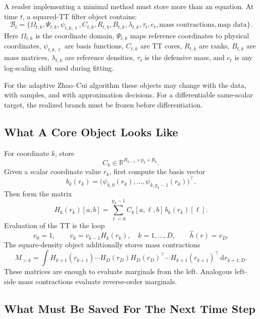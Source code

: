 \documentclass[11pt]{article}
\newcommand{\R}{\mathbb R}
\newcommand{\dd}{\,\mathrm d}
\begin{document}
A reader implementing a minimal method must store more than an equation.  At
time \(t\), a squared-TT filter object contains:
\[
    \mathcal B_t
    =
    \{
    \Omega_{t,k},\Psi_{t,k},\psi_{t,k,\ell},C_{t,k},
    R_{t,k},B_{t,k},\lambda_{t,k},\tau_t,c_t,
    \text{mass contractions},\text{map data}
    \}.
\]
Here \(\Omega_{t,k}\) is the coordinate domain, \(\Psi_{t,k}\) maps reference
coordinates to physical coordinates, \(\psi_{t,k,\ell}\) are basis functions,
\(C_{t,k}\) are TT cores, \(R_{t,k}\) are ranks, \(B_{t,k}\) are mass matrices,
\(\lambda_{t,k}\) are reference densities, \(\tau_t\) is the defensive mass, and
\(c_t\) is any log-scaling shift used during fitting.

For the adaptive Zhao--Cui algorithm these objects may change with the data,
with samples, and with approximation decisions.  For a differentiable
same-scalar target, the realized branch must be frozen before differentiation.

\subsection{What A Core Object Looks Like}

For coordinate \(k\), store
\[
    C_k\in\R^{R_{k-1}\times p_k\times R_k}.
\]
Given a scalar coordinate value \(r_k\), first compute the basis vector
\[
    b_k(r_k)=
    \bigl(\psi_{k,0}(r_k),\ldots,\psi_{k,p_k-1}(r_k)\bigr)^\top.
\]
Then form the matrix
\[
    H_k(r_k)[a,b]
    =
    \sum_{\ell=0}^{p_k-1}C_k[a,\ell,b]\,b_k(r_k)[\ell].
    \tag{D1}
\]
Evaluation of the TT is the loop
\[
    v_0=1,\qquad
    v_k=v_{k-1}H_k(r_k),\quad k=1,\ldots,D,
    \qquad
    \widehat h(r)=v_D.
    \tag{D2}
\]
The square-density object additionally stores mass contractions
\[
    M_{>k}
    =
    \int H_{k+1}(r_{k+1})\cdots H_D(r_D)
    H_D(r_D)^\top\cdots H_{k+1}(r_{k+1})^\top
    \dd r_{k+1:D}.
    \tag{D3}
\]
These matrices are enough to evaluate marginals from the left.  Analogous
left-side mass contractions evaluate reverse-order marginals.

\subsection{What Must Be Saved For The Next Time Step}
\end{document}
